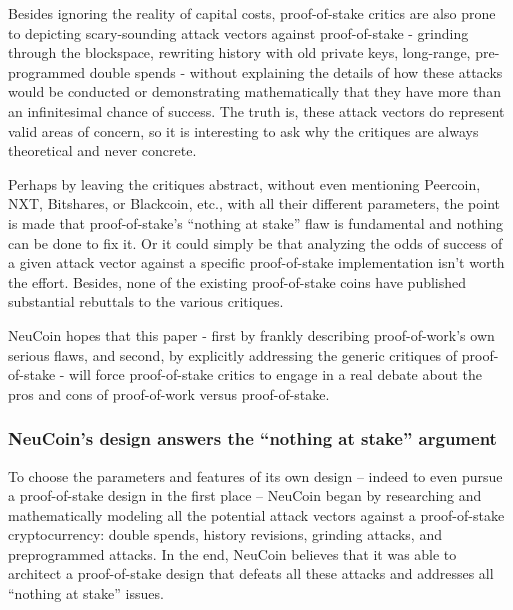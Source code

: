 \documentclass[a4paper,11pt]{article}
\begin{document}
Besides ignoring the reality of capital costs, proof-of-stake critics are also prone to depicting scary-sounding attack vectors against proof-of-stake - grinding through the blockspace, rewriting history with old private keys, long-range, pre-programmed double spends - without explaining the details of how these attacks would be conducted or demonstrating mathematically that they have more than an infinitesimal chance of success. The truth is, these attack vectors do represent valid areas of concern, so it is interesting to ask why the critiques are always theoretical and never concrete.

Perhaps by leaving the critiques abstract, without even mentioning Peercoin, NXT, Bitshares, or Blackcoin, etc., with all their different parameters, the point is made that proof-of-stake's ``nothing at stake'' flaw is fundamental and nothing can be done to fix it. Or it could simply be that analyzing the odds of success of a given attack vector against a specific proof-of-stake implementation isn't worth the effort. Besides, none of the existing proof-of-stake coins have published substantial rebuttals to the various critiques. 

NeuCoin hopes that this paper - first by frankly describing proof-of-work's own serious flaws, and second, by explicitly addressing the generic critiques of proof-of-stake - will force proof-of-stake critics to engage in a real debate about the pros and cons of proof-of-work versus proof-of-stake.

\subsubsection*{NeuCoin's design answers the ``nothing at stake'' argument}

To choose the parameters and features of its own design – indeed to even pursue a proof-of-stake design in the first place – NeuCoin began by researching and mathematically modeling all the potential attack vectors against a proof-of-stake cryptocurrency: double spends, history revisions, grinding attacks, and preprogrammed attacks. In the end, NeuCoin believes that it was able to architect a proof-of-stake design that defeats all these attacks and addresses all ``nothing at stake'' issues.
\end{document}

